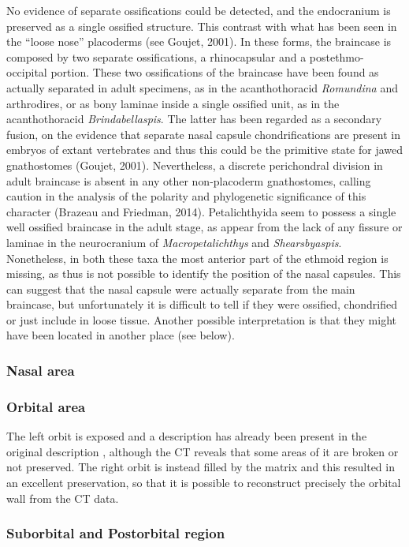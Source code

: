 \documentclass[12pt,letterpaper]{article}
\begin{document}
No evidence of separate ossifications could be detected, and the endocranium is preserved as a single ossified structure. This contrast with what has been seen in the “loose nose” placoderms (see Goujet, 2001). In these forms, the braincase is composed by two separate ossifications, a rhinocapsular and a postethmo-occipital portion. These two ossifications of the braincase have been found as actually separated in adult specimens, as in the acanthothoracid \textit{Romundina} and arthrodires, or as bony laminae inside a single ossified unit, as in the acanthothoracid \textit{Brindabellaspis}. The latter has been regarded as a secondary fusion, on the evidence that separate nasal capsule chondrifications are present in embryos of extant vertebrates and thus this could be the primitive state for jawed gnathostomes (Goujet, 2001). Nevertheless, a discrete perichondral division in adult braincase is absent in any other non-placoderm gnathostomes, calling caution in the analysis of the polarity and phylogenetic significance of this character (Brazeau and Friedman, 2014). Petalichthyida seem to possess a single well ossified braincase in the adult stage, as appear from the lack of any fissure or laminae in the neurocranium of \textit{Macropetalichthys} and \textit{Shearsbyaspis}. Nonetheless, in both these taxa the most anterior part of the ethmoid region is missing, as thus is not possible to identify the position of the nasal capsules. This can suggest that the nasal capsule were actually separate from the main braincase, but unfortunately it is difficult to tell if they were ossified, chondrified or just include in loose tissue. Another possible interpretation is that they might have been located in another place (see below).
\subsubsection{Nasal area}
\subsubsection{Orbital area}

The left orbit is exposed and a description has already been present in the original description \citep{Young1985}, although the CT reveals that some areas of it are broken or not preserved. The right orbit is instead filled by the matrix and this resulted in an excellent preservation, so that it is possible to reconstruct precisely the orbital wall from the CT data. 

\subsubsection{Suborbital and Postorbital region}
\end{document}
